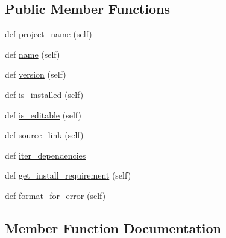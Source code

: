 \subsection*{Public Member Functions}
\begin{DoxyCompactItemize}
\item 
def \hyperlink{classpip_1_1__internal_1_1resolution_1_1resolvelib_1_1base_1_1Candidate_ac57eb483769275262b244cbcd3a66b61}{project\+\_\+name} (self)
\item 
def \hyperlink{classpip_1_1__internal_1_1resolution_1_1resolvelib_1_1base_1_1Candidate_a8b39f3d3af882944335121c05d86da76}{name} (self)
\item 
def \hyperlink{classpip_1_1__internal_1_1resolution_1_1resolvelib_1_1base_1_1Candidate_a3438563e0acd16869e50ac3b3f0e754c}{version} (self)
\item 
def \hyperlink{classpip_1_1__internal_1_1resolution_1_1resolvelib_1_1base_1_1Candidate_ade6bfcaa96082f2102bfea7cf4a2c0e1}{is\+\_\+installed} (self)
\item 
def \hyperlink{classpip_1_1__internal_1_1resolution_1_1resolvelib_1_1base_1_1Candidate_a79ec24520e4f55b376632b3d52733cfa}{is\+\_\+editable} (self)
\item 
def \hyperlink{classpip_1_1__internal_1_1resolution_1_1resolvelib_1_1base_1_1Candidate_a68d96afd0647cf63da55953c2ac2e489}{source\+\_\+link} (self)
\item 
def \hyperlink{classpip_1_1__internal_1_1resolution_1_1resolvelib_1_1base_1_1Candidate_a06a9a76de03addad3509c7f72b4e7175}{iter\+\_\+dependencies}
\item 
def \hyperlink{classpip_1_1__internal_1_1resolution_1_1resolvelib_1_1base_1_1Candidate_a9595c2fada663c2407e2b5c6b4f00bde}{get\+\_\+install\+\_\+requirement} (self)
\item 
def \hyperlink{classpip_1_1__internal_1_1resolution_1_1resolvelib_1_1base_1_1Candidate_aab458dce94e356be17bf0b78f22436a9}{format\+\_\+for\+\_\+error} (self)
\end{DoxyCompactItemize}


\subsection{Member Function Documentation}
\mbox{\label{classpip_1_1__internal_1_1resolution_1_1resolvelib_1_1base_1_1Candidate_aab458dce94e356be17bf0b78f22436a9}} 
